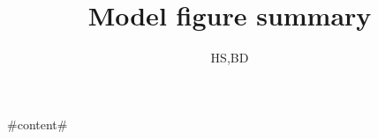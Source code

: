 \documentclass{article}
\title{Model figure summary}
\author{HS,BD}
\begin{document}
\maketitle
\newpage

#content#
\end{document}
